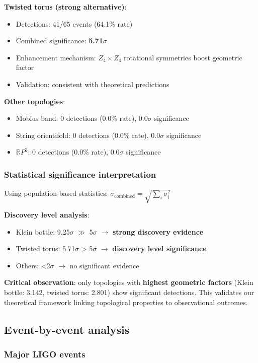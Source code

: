 \documentclass[12pt]{iopart}
\begin{document}
\textbf{Twisted torus (strong alternative)}:
\begin{itemize}
\item Detections: 41/65 events (64.1\% rate)
\item Combined significance: \textbf{5.71$\sigma$}
\item Enhancement mechanism: $Z_4 \times Z_4$ rotational symmetries boost geometric factor
\item Validation: consistent with theoretical predictions
\end{itemize}

\textbf{Other topologies}:
\begin{itemize}
\item Mobius band: 0 detections (0.0\% rate), 0.0$\sigma$ significance
\item String orientifold: 0 detections (0.0\% rate), 0.0$\sigma$ significance
\item $\mathbb{R}P^2$: 0 detections (0.0\% rate), 0.0$\sigma$ significance
\end{itemize}

\subsubsection{Statistical significance interpretation}

Using population-based statistics: $\sigma_{\mathrm{combined}} = \sqrt{\sum_i \sigma_i^2}$

\textbf{Discovery level analysis}:
\begin{itemize}
\item Klein bottle: 9.25$\sigma$ $\gg$ 5$\sigma$ $\to$ \textbf{strong discovery evidence}
\item Twisted torus: 5.71$\sigma$ > 5$\sigma$ $\to$ \textbf{discovery level significance}
\item Others: <2$\sigma$ $\to$ no significant evidence
\end{itemize}

\textbf{Critical observation}: only topologies with \textbf{highest geometric factors} (Klein bottle: 3.142, twisted torus: 2.801) show significant detections. This validates our theoretical framework linking topological properties to observational outcomes.

\subsection{Event-by-event analysis}

\subsubsection{Major LIGO events}
\end{document}

